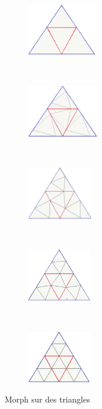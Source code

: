 \begin{figure}[H]
    \centering
    \begin{subfigure}[b]{0.17\textwidth}
       \centering \includegraphics[width=\textwidth,height=2.25cm]{img/morph5.png}
       \caption{}\label{subfig:morph5}
    \end{subfigure}
    ~ 
    \begin{subfigure}[b]{0.17\textwidth}
       \centering \includegraphics[width=\textwidth,height=2.3cm]{img/morph4.png}
       \caption{}\label{subfig:morph4}
    \end{subfigure}
    ~
    \begin{subfigure}[b]{0.17\textwidth}
       \centering \includegraphics[width=\textwidth,height=2.3cm]{img/morph3.png}
       \caption{}\label{subfig:morph3}
    \end{subfigure}
    ~
    \begin{subfigure}[b]{0.16\textwidth}
       \centering \includegraphics[width=\textwidth,height=2.3cm]{img/morph2.png}
       \caption{}\label{subfig:morph2}
    \end{subfigure}
     ~
    \begin{subfigure}[b]{0.16\textwidth}
       \centering \includegraphics[width=\textwidth,height=2.3cm]{img/morph1.png}
       \caption{}\label{subfig:morph1}
    \end{subfigure}
    \caption{Morph sur des triangles}\label{fig:morphTri}
\end{figure}

